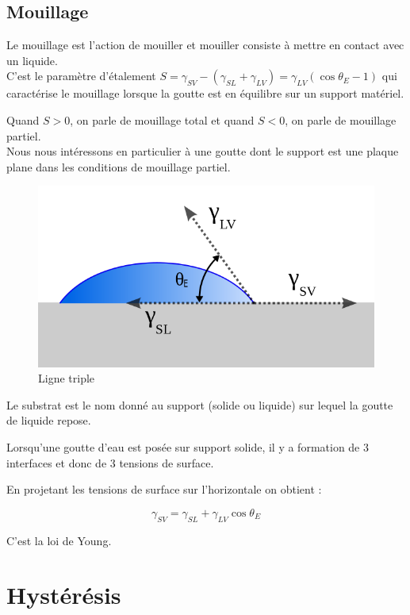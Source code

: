 \subsection{Mouillage}
Le mouillage est l'action de mouiller et mouiller consiste à  mettre en contact avec un liquide.\\


C'est le paramètre d'étalement $S = \gamma_{SV} - (\gamma_{SL} + \gamma_{LV}) = \gamma_{LV}(\cos\theta_{E} - 1)$ qui caractérise le mouillage lorsque la goutte est en équilibre sur un support matériel.

Quand $S > 0$, on parle de mouillage total et quand $S < 0$, on parle de mouillage partiel.\\

Nous nous intéressons en particulier à une goutte dont le support est une plaque plane dans les conditions de mouillage partiel. 
\begin{figure}[ht]
	\centering
	\includegraphics[scale = 0.3]{./gfx/Contact_angle2.png}
	\caption{Ligne triple}
\end{figure}



Le substrat est le nom donné au support (solide ou liquide) sur lequel la goutte de liquide repose.

Lorsqu'une goutte d'eau est posée sur support solide, il y a formation de 3 interfaces et donc de 3 tensions de surface.


En projetant les tensions de surface sur l'horizontale on obtient :

\begin{equation}
	\label{eq:Young}
	\gamma_{SV}  = \gamma_{SL} + \gamma_{LV}\cos\theta_{E}
\end{equation}

C'est la loi de Young.

\section{Hystérésis}


